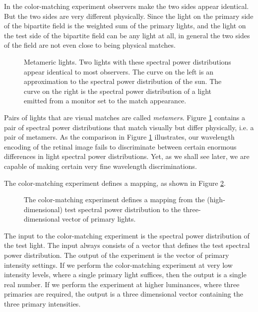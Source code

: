 In the color-matching experiment
observers make the two sides appear identical.
But the two sides are very different physically.
Since the light on the primary side of
the bipartite field
is the weighted sum of the primary lights,
and the light on the test side of the
bipartite field can be any light at all,
in general the two sides of the field are not
even close to being physical matches.

\begin{figure}
\centerline {
}
\caption[Monitor Metamers]{
Metameric lights.
Two lights with these spectral power distributions
appear identical to most observers.
The curve on the left is an approximation
to the spectral power distribution of the sun.
The curve on the right
is the spectral power distribution of 
a light emitted from a monitor
set to the match appearance.
}
\label{f3:metamers}
\end{figure}
Pairs of lights that are visual
matches are called {\em metamers}.
Figure \ref{f3:metamers}
contains a pair of spectral power distributions
that match visually but differ physically, i.e.
a pair of metamers.
As the comparison in Figure \ref{f3:metamers} illustrates,
our wavelength encoding of the retinal image fails to discriminate
between certain
enormous differences in light spectral power distributions.
Yet, as we shall see later, we are capable of making
certain very fine wavelength discriminations.

The color-matching experiment defines
a mapping, as shown in Figure \ref{f3:matching.map}.
\begin{figure}
\centerline {
}
\caption[Color Matching Mapping]{
The color-matching experiment defines a
mapping from the (high-dimensional) test spectral power distribution
to the three-dimensional vector of primary lights.
}
\label{f3:matching.map}
\end{figure}
The input to the color-matching experiment is the
spectral power distribution of the test light.
The input always consists
of a vector that defines the test spectral power distribution.
The output of the experiment is the vector
of primary intensity settings.
If we perform the color-matching experiment at very
low intensity levels, where a single primary light suffices,
then the output is a single real number.
If we perform the experiment at higher luminances,
where three primaries are required,
the output is a three dimensional vector containing
the three primary intensities.

